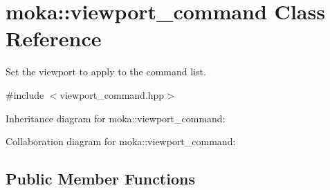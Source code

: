 \hypertarget{classmoka_1_1viewport__command}{}\section{moka\+::viewport\+\_\+command Class Reference}
\label{classmoka_1_1viewport__command}


Set the viewport to apply to the command list.  




{\ttfamily \#include $<$viewport\+\_\+command.\+hpp$>$}



Inheritance diagram for moka\+::viewport\+\_\+command\+:


Collaboration diagram for moka\+::viewport\+\_\+command\+:
\subsection*{Public Member Functions}

